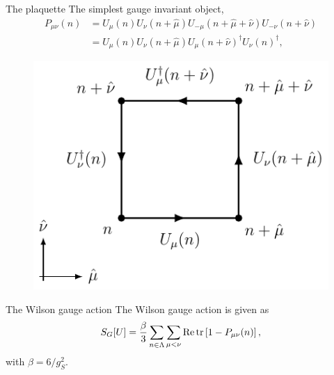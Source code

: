 \documentclass[10pt,show notes on second screen]{beamer}
\begin{document}
\begin{frame}{The plaquette}
The simplest gauge invariant object,
\begin{align*}
    P_{\mu\nu}(n) &= U_\mu(n) U_{\nu}(n+\hat{\mu}) U_{-\mu}(n+\hat{\mu}+\hat{\nu}) U_{-\nu} (n+\hat{\nu}) \nonumber \\
    &= U_\mu(n) U_{\nu}(n+\hat{\mu}) U_{\mu}(n+\hat{\nu})^\dagger U_{\nu} (n)^\dagger,
\end{align*}
\begin{figure}
    \centering
    \includegraphics[scale=1]{../figures/illustrations/lqcd/plaquette/plaquette}
\end{figure}
\end{frame}

\begin{frame}{The Wilson gauge action}
The Wilson gauge action is given as
\begin{align}
    S_G[U] = \frac{\beta}{3} \sum_{n\in\Lambda} \sum_{\mu<\nu} \operatorname{Re} \mathrm{tr} \left[ 1 - P_{\mu\nu}(n) \right],
\end{align}
with $\beta=6/g_S^2$.
\end{frame}

\end{document}
